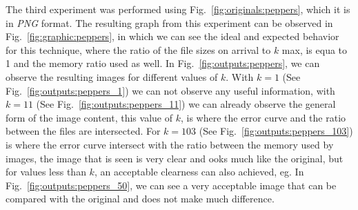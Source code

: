 \documentclass[journal]{IEEEtran}
\begin{document}
The third experiment was performed using Fig.~\ref{fig:originals:peppers}, which it is in \textit{PNG} format.
The resulting graph from this experiment can be observed in Fig.~\ref{fig:graphic:peppers}, in which we can see the ideal and expected behavior for this technique, where the ratio of the file sizes on arrival  to $k$ max, is equa to 1 and the memory ratio used as well.
In Fig.~\ref{fig:outputs:peppers}, we can observe the resulting images for different values of $k$. With $k=1$ (See Fig.~\ref{fig:outputs:peppers_1}) we can not observe any useful information, with $k=11$ (See Fig.~\ref{fig:outputs:peppers_11}) we can already observe the general form of the image content, this value of $k$, is where the error curve and the ratio between the files are intersected.
For  $k=103$ (See Fig.~\ref{fig:outputs:peppers_103}) is where the error curve intersect with the ratio between the memory used by images, the image that is seen is very clear and ooks much like the original, but for values less than $k$, an acceptable clearness can also achieved, eg. In Fig.~\ref{fig:outputs:peppers_50}, we can see a very acceptable image that can be compared with the original and does not make much difference.
\end{document}
